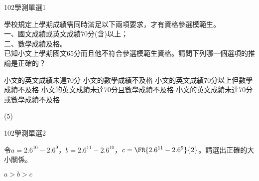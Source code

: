 \begin{QUESTIONS}
    \begin{QUESTION}
        \begin{ExamInfo}{102}{學測}{單選}{1}
        \end{ExamInfo}
        \begin{ExamAnsRateInfo}{70}{88}{73}{49}
        \end{ExamAnsRateInfo}
        \begin{QBODY}
			學校規定上學期成績需同時滿足以下兩項要求，才有資格參選模範生。\\
				一、國文成績或英文成績70分(含)以上；\\
				二、數學成績及格。\\
				已知小文上學期國文65分而且他不符合參選模範生資格。請問下列哪一個選項的推論是正確的？
				\begin{QOPS}
					\QOP 小文的英文成績未達70分
					\QOP 小文的數學成績不及格
					\QOP 小文的英文成績70分以上但數學成績不及格
					\QOP 小文的英文成績未達70分且數學成績不及格
					\QOP 小文的英文成績未達70分或數學成績不及格
				\end{QOPS}
        \end{QBODY}
        \begin{QFROMS}
        \end{QFROMS}
        \begin{QTAGS}\end{QTAGS}
        \begin{QANS}
            (5)
        \end{QANS}
        \begin{QSOLLIST}
        \end{QSOLLIST}
        \begin{QEMPTYSPACE}
        \end{QEMPTYSPACE}
    \end{QUESTION}
    \begin{QUESTION}
        \begin{ExamInfo}{102}{學測}{單選}{2}
        \end{ExamInfo}
        \begin{ExamAnsRateInfo}{66}{90}{72}{36}
        \end{ExamAnsRateInfo}
        \begin{QBODY}
			令$a={{2.6}^{10}}-{{2.6}^{9}}$，$b={{2.6}^{11}}-{{2.6}^{10}}$，$c=\FR{{{2.6}^{11}}-{{2.6}^{9}}}{2}$。請選出正確的大小關係。
			\begin{QOPS}
				\QOP $a>b>c$

\end{QOPS}
\end{QBODY}
\end{QUESTION}
\end{QUESTIONS}
